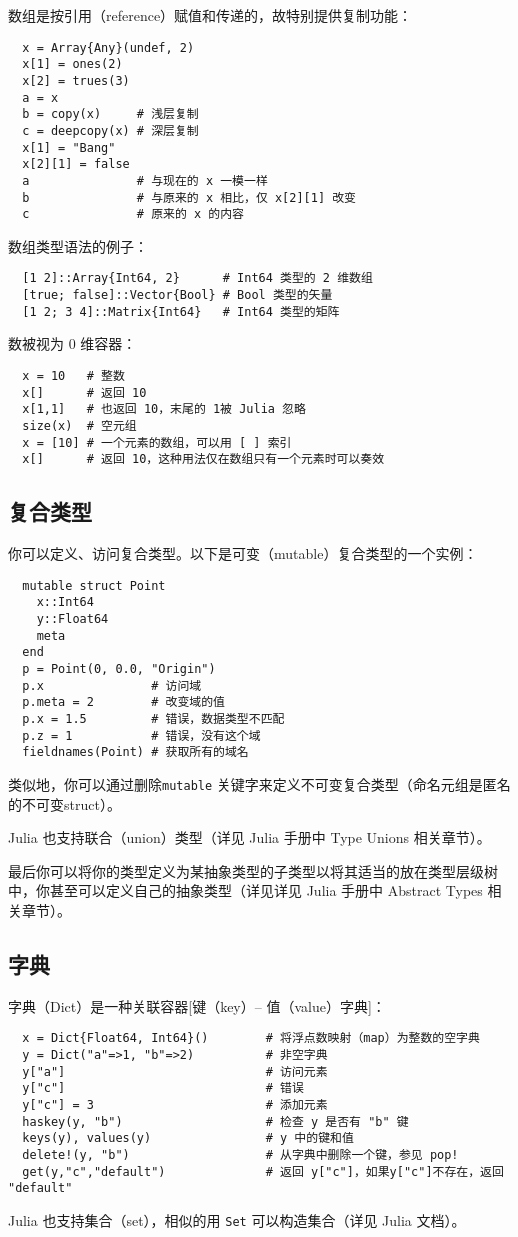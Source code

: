 \documentclass[10pt,a4paper]{article}
\begin{document}
数组是按引用（reference）赋值和传递的，故特别提供复制功能：
\begin{lstlisting}
  x = Array{Any}(undef, 2)
  x[1] = ones(2)
  x[2] = trues(3)
  a = x
  b = copy(x)     # 浅层复制
  c = deepcopy(x) # 深层复制
  x[1] = "Bang"
  x[2][1] = false
  a               # 与现在的 x 一模一样
  b               # 与原来的 x 相比，仅 x[2][1] 改变
  c               # 原来的 x 的内容
\end{lstlisting}

数组类型语法的例子：
\begin{lstlisting}
  [1 2]::Array{Int64, 2}      # Int64 类型的 2 维数组
  [true; false]::Vector{Bool} # Bool 类型的矢量
  [1 2; 3 4]::Matrix{Int64}   # Int64 类型的矩阵
\end{lstlisting}

数被视为 0 维容器：
\begin{lstlisting}
  x = 10   # 整数
  x[]      # 返回 10
  x[1,1]   # 也返回 10，末尾的 1被 Julia 忽略
  size(x)  # 空元组
  x = [10] # 一个元素的数组，可以用 [ ] 索引
  x[]      # 返回 10，这种用法仅在数组只有一个元素时可以奏效
\end{lstlisting}

\subsection{复合类型}
你可以定义、访问复合类型。以下是可变（mutable）复合类型的一个实例：
\begin{lstlisting}
  mutable struct Point
    x::Int64
    y::Float64
    meta
  end
  p = Point(0, 0.0, "Origin")
  p.x               # 访问域
  p.meta = 2        # 改变域的值
  p.x = 1.5         # 错误，数据类型不匹配
  p.z = 1           # 错误，没有这个域
  fieldnames(Point) # 获取所有的域名
\end{lstlisting}

类似地，你可以通过删除\lstinline|mutable| 关键字来定义不可变复合类型（命名元组是匿名的不可变struct）。 

Julia 也支持联合（union）类型（详见 Julia 手册中 Type Unions 相关章节）。

最后你可以将你的类型定义为某抽象类型的子类型以将其适当的放在类型层级树中，你甚至可以定义自己的抽象类型（详见详见 Julia 手册中 Abstract Types 相关章节）。

\subsection{字典}
字典（Dict）是一种关联容器[键（key）-- 值（value）字典]：
\begin{lstlisting}
  x = Dict{Float64, Int64}()        # 将浮点数映射（map）为整数的空字典
  y = Dict("a"=>1, "b"=>2)          # 非空字典
  y["a"]                            # 访问元素
  y["c"]                            # 错误
  y["c"] = 3                        # 添加元素
  haskey(y, "b")                    # 检查 y 是否有 "b" 键
  keys(y), values(y)                # y 中的键和值
  delete!(y, "b")                   # 从字典中删除一个键，参见 pop!
  get(y,"c","default")              # 返回 y["c"]，如果y["c"]不存在，返回 "default"
\end{lstlisting}
Julia 也支持集合（set），相似的用 \lstinline|Set| 可以构造集合（详见 Julia 文档）。
\end{document}
